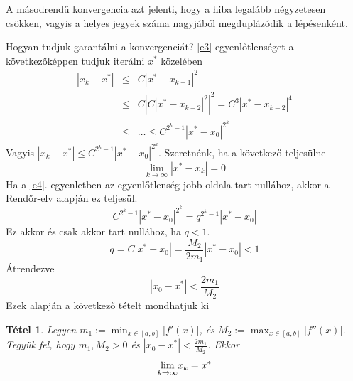 \documentclass[a4paper,12pt]{report}
\newtheorem{Tet}{Tétel}[section]
\begin{document}
			A másodrendű konvergencia azt jelenti, hogy a hiba legalább négyzetesen csökken, vagyis a helyes jegyek száma nagyjából megduplázódik a lépésenként.

			Hogyan tudjuk garantálni a konvergenciát? \ref{e3} egyenlőtlenséget a következőképpen tudjuk iterálni $x^*$ közelében
			\begin{eqnarray}
				|x_k-x^*|&\leq& C |x^*-x_{k-1}|^2\\
				&\leq & C\left |C|x^*-x_{k-2}|^2\right |^2=C^3|x^*-x_{k-2}|^4\\
				&\leq & \ldots\leq C^{2^k-1} |x^*-x_0|^{2^k}\label{e4}
			\end{eqnarray}
			Vagyis $|x_k-x^*|\leq C^{2^k-1}|x^*-x_0|^{2^k}$. Szeretnénk, ha a következő teljesülne
			\[ \lim_{k \to \infty} |x^*-x_k|=0\]
			Ha a \ref{e4}. egyenletben az egyenlőtlenség jobb oldala tart nullához, akkor a Rendőr-elv alapján ez teljesül.
			\[ C^{2^k-1}|x^*-x_0|^{2^k}=q^{2^k-1}|x^*-x_0| \]
			Ez akkor és csak akkor tart nullához, ha $q<1$.
			\[q=C|x^*-x_0|=  \frac{M_2}{2 m_1} \left |x^*-x_0 \right | < 1 \]
			Átrendezve
			\[ |x_0-x^*|<  \frac{2 m_1}{M_2} \]
			Ezek alapján a következő tételt mondhatjuk ki\
			\begin{Tet}
				Legyen $m_1:=\min_{x \in [a,b]} |f'(x)|$, és $M_2:=\max_{x\in [a,b]} |f''(x)|$. Tegyük fel, hogy $m_1, M_2 > 0$ és $ |x_0-x^*|<  \frac{2 m_1}{M_2} $. Ekkor
				\[\smash{\displaystyle \lim_{k\to \infty} }x_k= x^*\]
			\end{Tet}
\end{document}
